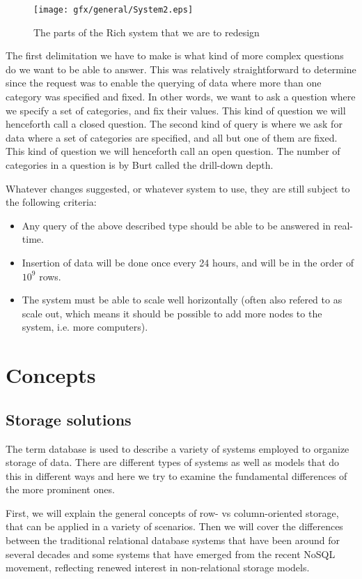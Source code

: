 \begin{figure} [h]
    \centering
    \texttt{[image: gfx/general/System2.eps]}
    \caption{The parts of the Rich system that we are to redesign}
    \label{fig:rich_high}
\end{figure}

The first delimitation we have to make is what kind of more complex questions do we want to be able to answer. This was relatively straightforward to determine since the request was to enable the querying of data where more than one category was specified and fixed. In other words, we want to ask a question where we specify a set of categories, and fix their values. This kind of question we will henceforth call a closed question. The second kind of query is where we ask for data where a set of categories are specified, and all but one of them are fixed. This kind of question we will henceforth call an open question. The number of categories in a question is by Burt called the drill-down depth.

Whatever changes suggested, or whatever system to use, they are still subject to the following criteria:
\begin{itemize}
\item Any query of the above described type should be able to be answered in real-time.
\item Insertion of data will be done once every 24 hours, and will be in the order of $10^9$ rows.
\item The system must be able to scale well horizontally (often also refered to as scale out, which means it should be possible to add more nodes to the system, i.e. more computers).
\end{itemize}

\pagebreak
\chapter{Concepts} \label{chap:Concepts}

\section{Storage solutions}

The term database is used to describe a variety of systems employed to organize storage of data. There are different types of systems as well as models that do this in different ways and here we try to examine the fundamental differences of the more prominent ones.

First, we will explain the general concepts of row- vs column-oriented storage, that can be applied in a variety of scenarios. Then we will cover the differences between the traditional relational database systems that have been around for several decades and some systems that have emerged from the recent NoSQL movement, reflecting renewed interest in non-relational storage models.

